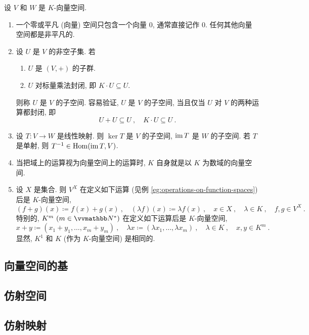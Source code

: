 \begin{example}\label{eg:vector-spaces}
    设 \(V\) 和 \(W\) 是 \(K\)-向量空间.
    \begin{enumerate}
        \item 一个零或平凡 (向量) 空间只包含一个向量 \(0\), 通常直接记作 \(0\). 任何其他向量空间都是非平凡的.
        \item 设 \(U\) 是 \(V\) 的非空子集. 若
        \begin{enumerate}[label={\((\mathrm{SS}_{\arabic*})\)}]
            \item \(U\) 是 \((V, +)\) 的子群.
            \item \(U\) 对标量乘法封闭, 即 \(K \cdot U \subseteq U\).
        \end{enumerate}
        则称 \(U\) 是 \(V\) 的子空间. 容易验证, \(U\) 是 \(V\) 的子空间, 当且仅当 \(U\) 对 \(V\) 的两种运算都封闭, 即
        \[
            U + U \subseteq U\ ,\quad K \cdot U \subseteq U\ .
        \]
        \item 设 \(T \colon V \to W\) 是线性映射. 则 \(\ker T\) 是 \(V\) 的子空间, \(\operatorname{im} T\) 是 \(W\) 的子空间. 若 \(T\) 是单射, 则 \(T^{-1} \in \operatorname{Hom}(\operatorname{im} T, V)\).
        \item 当把域上的运算视为向量空间上的运算时, \(K\) 自身就是以 \(K\) 为数域的向量空间.
        \item 设 \(X\) 是集合. 则 \(V^X\) 在定义如下运算 (见例 \ref{eg:operations-on-function-spaces}) 后是 \(K\)-向量空间,
        \[
            (f + g)(x) \coloneqq f(x) + g(x)\ ,\quad (\lambda f)(x) \coloneqq \lambda f(x)\ ,\quad x \in X\ ,\quad \lambda \in K\ ,\quad f, g \in V^X\ .
        \]
        特别的, \(K^m\ (m \in \N^\ast)\) 在定义如下运算后是 \(K\)-向量空间,
        \[
            x + y \coloneqq (x_1 + y_1, \ldots, x_m + y_m)\ ,\quad \lambda x \coloneqq (\lambda x_1, \ldots, \lambda x_m)\ ,\quad \lambda \in K\ ,\quad x, y \in K^m\ .
        \]
        显然, \(K^1\) 和 \(K\) (作为 \(K\)-向量空间) 是相同的.
    \end{enumerate}
\end{example}

\subsection{向量空间的基}

\subsection{仿射空间}

\subsection{仿射映射}


